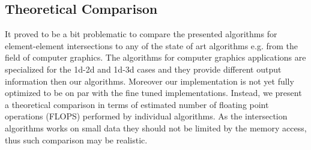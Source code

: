 

\subsection{Theoretical Comparison}
It proved to be a bit problematic to compare the presented algorithms for element-element intersections to any of the state of art
algorithms e.g. from the field of computer graphics. The algorithms for computer graphics applications are specialized for
the 1d-2d and 1d-3d cases and they provide different output information then our algorithms. Moreover our implementation 
is not yet fully optimized to be on par with the fine tuned implementations. Instead, we present a theoretical comparison 
in terms of estimated number of floating point operations (FLOPS) performed by individual algorithms. As the intersection 
algorithms works on small data they should not be limited by the memory access, thus such comparison may be realistic. 

